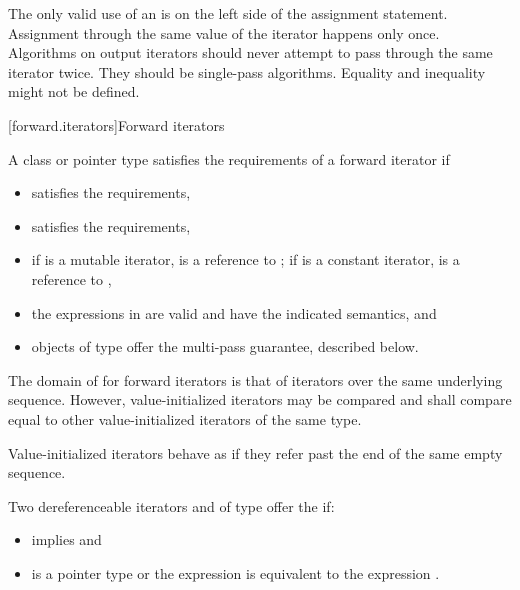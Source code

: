 \pnum
\begin{note}
The only valid use of an
is on the left side of the assignment statement.
Assignment through the same value of the iterator happens only once.
Algorithms on output iterators should never attempt to pass through the same iterator twice.
They should be single-pass algorithms.
Equality and inequality might not be defined.
\end{note}

[forward.iterators]{Forward iterators}

\pnum
A class or pointer type
satisfies the requirements of a forward iterator if

\begin{itemize}
\item {} satisfies the  requirements,

\item {} satisfies the 
requirements,

\item if  is a mutable iterator,  is a reference to ;
if  is a constant iterator,  is a reference to ,

\item the expressions in 
are valid and have the indicated semantics, and

\item objects of type  offer the multi-pass guarantee, described below.
\end{itemize}

\pnum
The domain of \tcode{==} for forward iterators is that of iterators over the same
underlying sequence. However, value-initialized iterators may be compared and
shall compare equal to other value-initialized iterators of the same type.
\begin{note} Value-initialized iterators behave as if they refer past the end of
the same empty sequence. \end{note}

\pnum
Two dereferenceable iterators  and  of type  offer the
 if:

\begin{itemize}
\item {} implies  and
\item {} is a pointer type or the expression
 is equivalent to the expression .
\end{itemize}

